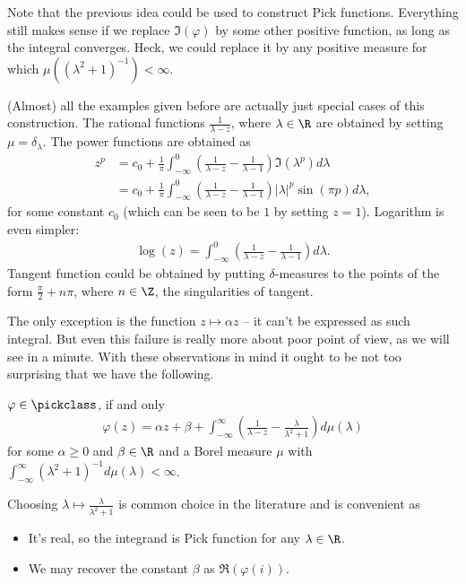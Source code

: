 Note that the previous idea could be used to construct Pick functions. Everything still makes sense if we replace $\Im(\varphi)$ by some other positive function, as long as the integral converges. Heck, we could replace it by any positive measure for which $\mu((\lambda^2 + 1)^{-1}) < \infty$.

(Almost) all the examples given before are actually just special cases of this construction. The rational functions $\frac{1}{\lambda - z}$, where $\lambda \in \R$ are obtained by setting $\mu = \delta_{\lambda}$. The power functions are obtained as
\begin{align*}
	z^{p} &= c_{0} + \frac{1}{\pi}\int_{-\infty}^{0} \left(\frac{1}{\lambda - z} - \frac{1}{\lambda - 1}\right) \Im(\lambda^{p}) d \lambda \\
	&= c_{0} + \frac{1}{\pi}\int_{-\infty}^{0} \left(\frac{1}{\lambda - z} - \frac{1}{\lambda - 1}\right) |\lambda|^{p} \sin(\pi p) d \lambda,
\end{align*}
for some constant $c_{0}$ (which can be seen to be $1$ by setting $z = 1$). Logarithm is even simpler:
\begin{align*}
	\log(z) = \int_{-\infty}^{0} \left(\frac{1}{\lambda - z} - \frac{1}{\lambda - 1}\right) d \lambda.
\end{align*}
Tangent function could be obtained by putting $\delta$-measures to the points of the form $\frac{\pi}{2} + n \pi$, where $n \in \Z$, the singularities of tangent.

The only exception is the function $z \mapsto \alpha z$ -- it can't be expressed as such integral. But even this failure is really more about poor point of view, as we will see in a minute. With these observations in mind it ought to be not too surprising that we have the following.

\begin{lause}\label{pick_nevanlinna_herglotz_representation_theorem}
	$\varphi \in \pickclass$, if and only
	\begin{align}\label{pick_representation}
		\varphi(z) = \alpha z + \beta + \int_{-\infty}^{\infty} \left(\frac{1}{\lambda - z} - \frac{\lambda}{\lambda^2 + 1}\right) d \mu(\lambda)
	\end{align}
	for some $\alpha \geq 0$ and $\beta \in \R$ and a Borel measure $\mu$ with $\int_{-\infty}^{\infty} (\lambda^2 + 1)^{-1} d \mu(\lambda) < \infty$.
\end{lause}

Choosing $\lambda \mapsto \frac{\lambda}{\lambda^2 + 1}$ is common choice in the literature and is convenient as
\begin{itemize}
	\item It's real, so the integrand is Pick function for any $\lambda \in \R$.
	\item We may recover the constant $\beta$ as $\Re(\varphi(i))$.
\end{itemize}

